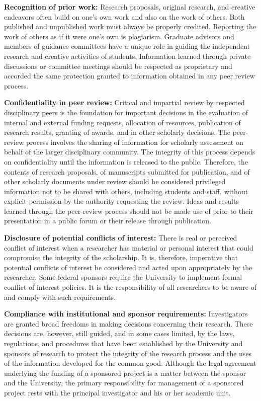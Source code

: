 \textbf{Recognition of prior work:} Research proposals, original
research, and creative endeavors often build on one’s own work and
also on the work of others. Both published and unpublished work must
always be properly credited. Reporting the work of others as if it
were one’s own is plagiarism. Graduate advisors and members of
guidance committees have a unique role in guiding the independent
research and creative activities of students. Information learned
through private discussions or committee meetings should be respected
as proprietary and accorded the same protection granted to information
obtained in any peer review process. 

\textbf{Confidentiality in peer review:} Critical and impartial review
by respected disciplinary peers is the foundation for important
decisions in the evaluation of internal and external funding requests,
allocation of resources, publication of research results, granting of
awards, and in other scholarly decisions. The peer-review process
involves the sharing of information for scholarly assessment on behalf
of the larger disciplinary community. The integrity of this process
depends on confidentiality until the information is released to the
public. Therefore, the contents of research proposals, of manuscripts
submitted for publication, and of other scholarly documents under
review should be considered privileged information not to be shared
with others, including students and staff, without explicit permission
by the authority requesting the review. Ideas and results learned
through the peer-review process should not be made use of prior to
their presentation in a public forum or their release through
publication. 

\textbf{Disclosure of potential conflicts of interest:} There is real
or perceived conflict of interest when a researcher has material or
personal interest that could compromise the integrity of the
scholarship. It is, therefore, imperative that potential conflicts of
interest be considered and acted upon appropriately by the
researcher. Some federal sponsors require the University to implement
formal conflict of interest policies. It is the responsibility of all
researchers to be aware of and comply with such requirements. 

\textbf{Compliance with institutional and sponsor requirements:}
Investigators are granted broad freedoms in making decisions
concerning their research. These decisions are, however, still guided,
and in some cases limited, by the laws, regulations, and procedures
that have been established by the University and sponsors of research
to protect the integrity of the research process and the uses of the
information developed for the common good. Although the legal
agreement underlying the funding of a sponsored project is a matter
between the sponsor and the University, the primary responsibility for
management of a sponsored project rests with the principal
investigator and his or her academic unit. 

